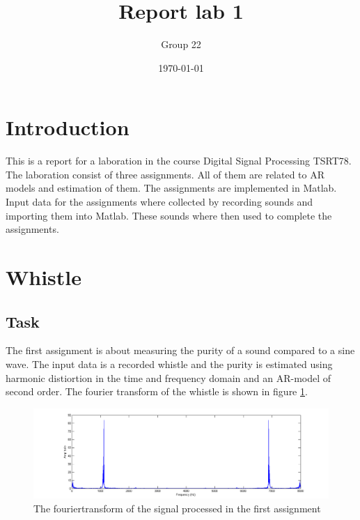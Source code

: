 \documentclass[12pt]{article}
\title{Report lab 1}
\author{Group 22}
\date{\today}
\begin{document}
%

\pagebreak

\maketitle

\pagebreak

\tableofcontents

\pagebreak

\section{Introduction}
This is a report for a laboration in the course Digital Signal Processing TSRT78.
The laboration consist of three assignments.
All of them are related to AR models and estimation of them.
The assignments are implemented in Matlab.
Input data for the assignments where collected by recording sounds and importing them into Matlab.
These sounds where then used to complete the assignments.

\section{Whistle}
\subsection{Task}
The first assignment is about measuring the purity of a sound compared to a sine wave. The input data is a recorded whistle and the purity is estimated using harmonic distiortion in the time and frequency domain and an AR-model of second order. The fourier transform of the whistle is shown in figure \ref{forwhis}.

\begin{figure}[H]
\centering
\includegraphics[width=14cm]{Fouriertranswhis.png}
\caption{The fouriertransform of the signal processed in the first assignment\label{forwhis}}

\end{figure}
\end{document}
